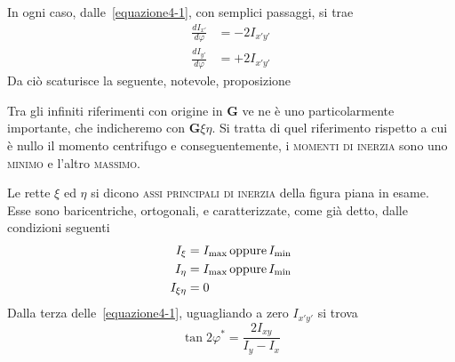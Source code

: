 \noindent In ogni caso, dalle~\eqref{equazione4-1}, con semplici passaggi, si trae
\begin{align*}
\frac{dI_{x'}}{d\varphi} &= -2I_{x'y'} \\
\frac{dI_{y'}}{d\varphi} &= +2I_{x'y'}
\end{align*}
Da ciò scaturisce la seguente, notevole, proposizione
\begin{quoting}
Tra gli infiniti riferimenti con origine in $\mathbf{G}$ ve ne è uno particolarmente importante, che indicheremo con $\mathbf{G}\xi\eta$. Si tratta di quel riferimento rispetto a cui è nullo il momento centrifugo e conseguentemente, i \textsc{momenti di inerzia} sono uno \textsc{minimo} e l'altro \textsc{massimo}.
\end{quoting}
Le rette $\xi$ ed $\eta$ si dicono \textsc{assi principali di inerzia} della figura piana in esame. Esse sono baricentriche, ortogonali, e caratterizzate, come già detto, dalle condizioni seguenti
\begin{align*}
I_{\xi} &= I_{\textup{max}}\,\textup{oppure}\,I_{\textup{min}} \\
I_{\eta} &= I_{\textup{max}}\,\textup{oppure}\,I_{\textup{min}} \\
I_{\xi\eta} &= 0
\end{align*}
Dalla terza delle~\eqref{equazione4-1}, uguagliando a zero $I_{x'y'}$ si trova
\begin{equation} \label{equazione4-2}
\boxed{\tan 2\varphi^* = \frac{2I_{xy}}{I_{y}-I_{x}}}
\tag{4.2}
\end{equation}
